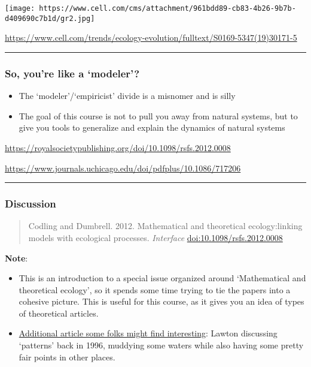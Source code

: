 \documentclass[
]{article}
\providecommand{\tightlist}{%
  \setlength{\itemsep}{0pt}\setlength{\parskip}{0pt}}
\begin{document}
\texttt{[image: https://www.cell.com/cms/attachment/961bdd89-cb83-4b26-9b7b-d409690c7b1d/gr2.jpg]}

\url{https://www.cell.com/trends/ecology-evolution/fulltext/S0169-5347(19)30171-5}

\begin{center}\rule{0.5\linewidth}{0.5pt}\end{center}

\hypertarget{so-youre-like-a-modeler}{%
\subsubsection{So, you're like a
`modeler'?}\label{so-youre-like-a-modeler}}

\begin{itemize}
\tightlist
\item
  The `modeler'/`empiricist' divide is a misnomer and is silly
\item
  The goal of this course is not to pull you away from natural systems,
  but to give you tools to generalize and explain the dynamics of
  natural systems
\end{itemize}

\url{https://royalsocietypublishing.org/doi/10.1098/rsfs.2012.0008}

\url{https://www.journals.uchicago.edu/doi/pdfplus/10.1086/717206}

\begin{center}\rule{0.5\linewidth}{0.5pt}\end{center}

\hypertarget{discussion}{%
\subsubsection{Discussion}\label{discussion}}

\begin{quote}
Codling and Dumbrell. 2012. Mathematical and theoretical ecology:linking
models with ecological processes. \emph{Interface}
\url{doi:10.1098/rsfs.2012.0008}
\end{quote}

\textbf{Note}:

\begin{itemize}
\item
  This is an introduction to a special issue organized around
  `Mathematical and theoretical ecology', so it spends some time trying
  to tie the papers into a cohesive picture. This is useful for this
  course, as it gives you an idea of types of theoretical articles.
\item
  \href{http://faculty.washington.edu/cet6/pub/Temp/CFR521e/Lawton_1996.pdf}{Additional
  article some folks might find interesting}: Lawton discussing
  `patterns' back in 1996, muddying some waters while also having some
  pretty fair points in other places.
\end{itemize}
\end{document}
